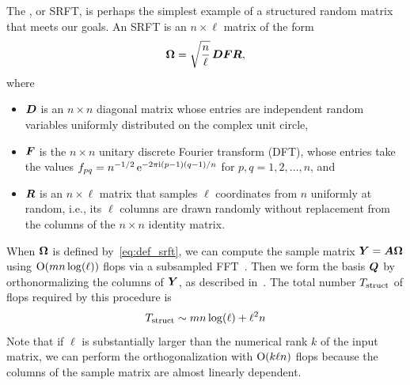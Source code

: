\documentclass{article}
\begin{document}
The , or SRFT, is perhaps the
simplest example of a structured random matrix that meets our goals.
An SRFT is an $n \times \ell$ matrix of the form
\begin{equation}
\label{eq:def_srft}
\bm{\Omega} = \sqrt{\frac{n}{\ell}} \, \bm{DFR},
\end{equation}
where
\lsp
\begin{itemize}
\item   $\bm{D}$ is an $n \times n$ diagonal matrix whose entries are
independent random variables uniformly distributed on the complex unit circle,

\item   $\bm{F}$ is the $n \times n$ unitary discrete Fourier transform (DFT),
whose entries take the values $f_{pq} = n^{-1/2} \, \mathrm{e}^{-2\pi\mathrm{i} (p-1)(q-1)/n}$ for $p, q = 1, 2, \dots, n$, and

\item   $\bm{R}$ is an $n \times \ell$ matrix that samples $\ell$ coordinates
from $n$ uniformly at random, i.e., its $\ell$ columns are drawn randomly
without replacement from the columns of the $n \times n$ identity matrix.
\end{itemize}
\lsp

When $\bm{\Omega}$ is defined by~\eqref{eq:def_srft}, we can compute the sample
matrix $\bm{Y} = \bm{A\Omega}$ using $\mathrm{O}(mn\log(\ell))$ flops via a
subsampled FFT~\cite{random2}.
Then we form the basis $\bm{Q}$ by orthonormalizing
the columns of $\bm{Y}$, as described in~\cite[\S~4.1]{RM}. %
The total number $T_{\rm struct}$ of flops required by this procedure is
\begin{equation}
\label{eq:cost_SRFT}
T_{\rm struct} \sim mn \log(\ell) + \ell^2 n
\end{equation}
%
Note that if $\ell$ is substantially larger than the numerical rank $k$
of the input matrix, we can perform the orthogonalization with $\mathrm{O}( k \ell n)$
flops because the columns of the sample matrix are almost linearly dependent.
\end{document}
